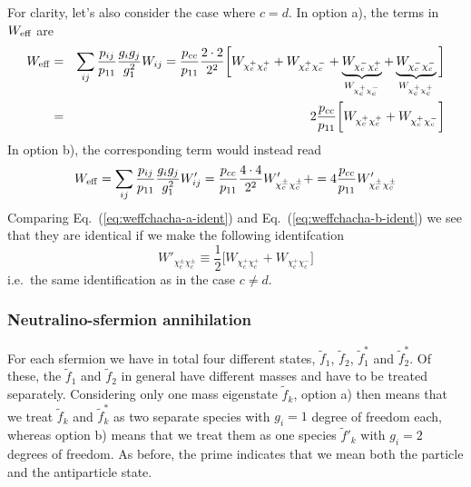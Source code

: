 For clarity, let's also consider the case where $c=d$.
In option a), the terms in $W_{\rm eff}$ are
\begin{eqnarray}
    W_{\rm eff} & = & \sum_{ij}\frac{p_{ij}}{p_{11}} 
    \frac{g_{i}g_{j}}{g_{1}^2} W_{ij}
    =
    \frac{p_{cc}}{p_{11}} \frac{2 \cdot 2}{2^2}
    \bigg[ 
    W_{\chi_{c}^+ \chi_{c}^+} +
    W_{\chi_{c}^+ \chi_{c}^-} +
    \underbrace{W_{\chi_{c}^- \chi_{c}^+}}_{W_{\chi_{c}^+ \chi_{c}^-}} +
    \underbrace{W_{\chi_{c}^- \chi_{c}^-}}_{W_{\chi_{c}^+ \chi_{c}^+}}
    \bigg] 
    \nonumber \\
    & = &
    2 \frac{p_{cc}}{p_{11}}
    \bigg[
    W_{\chi_{c}^+ \chi_{c}^+} +
    W_{\chi_{c}^+ \chi_{c}^-}
    \bigg]
    \label{eq:weffchacha-a-ident}
\end{eqnarray}
In option b), the corresponding term would instead read
\begin{equation}
    W_{\rm eff} = \sum_{ij}\frac{p_{ij}}{p_{11}} 
    \frac{g_{i}g_{j}}{g_{1}^2} W'_{ij} =
    \frac{p_{cc}}{p_{11}} \frac{4 \cdot 4}{2^2}
    W'_{\chi_{c}^\pm \chi_{c}^\pm} +
     = 4 \frac{p_{cc}}{p_{11}} W'_{\chi_{c}^\pm \chi_{c}^\pm}
    \label{eq:weffchacha-b-ident}
\end{equation}
Comparing Eq.~(\ref{eq:weffchacha-a-ident}) and 
Eq.~(\ref{eq:weffchacha-b-ident}) 
we see that they are identical if we make the following identifcation
\begin{equation}
    W'_{\chi_{c}^\pm \chi_{c}^\pm} \equiv \frac{1}{2} 
        \bigg[
    W_{\chi_{c}^+ \chi_{c}^+} +
    W_{\chi_{c}^+ \chi_{c}^-}
    \bigg]
\end{equation} 
i.e.\ the same identification as in the case $c \ne d$.

\subsubsection{Neutralino-sfermion annihilation}

For each sfermion we have in total four different states,
$\tilde{f}_{1}$, $\tilde{f}_{2}$, $\tilde{f}_{1}^{*}$ and
$\tilde{f}_{2}^{*}$.  Of these, the $\tilde{f}_{1}$ and
$\tilde{f}_{2}$ in general have different masses and have to be treated
separately.  Considering only one mass eigenstate $\tilde{f}_{k}$,
option a) then means that we treat $\tilde{f}_{k}$ and
$\tilde{f}_{k}^{*}$ as two separate species with $g_{i}=1$ degree of
freedom each, whereas option b) means that we treat them as one
species $\tilde{f}'_{k}$ with $g_{i}=2$ degrees of freedom.  As
before, the prime indicates that we mean both the particle and the
antiparticle state.

